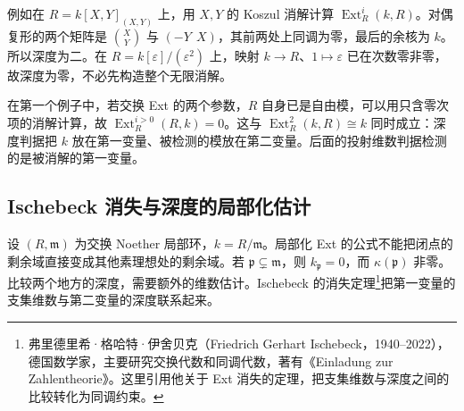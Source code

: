例如在 \(R=k[X,Y]_{(X,Y)}\) 上，用 \(X,Y\) 的 Koszul 消解计算 \(\operatorname{Ext}_R^i(k,R)\)。对偶复形的两个矩阵是 \(\binom XY\) 与 \((-Y\ \ X)\)，其前两处上同调为零，最后的余核为 \(k\)。所以深度为二。在 \(R=k[\varepsilon]/(\varepsilon^2)\) 上，映射 \(k\rightarrow R\)、\(1\mapsto\varepsilon\) 已在次数零非零，故深度为零，不必先构造整个无限消解。

\ProseParagraphBreak
在第一个例子中，若交换 Ext 的两个参数，\(R\) 自身已是自由模，可以用只含零次项的消解计算，故 \(\operatorname{Ext}_R^{i>0}(R,k)=0\)。这与 \(\operatorname{Ext}_R^2(k,R)\cong k\) 同时成立：深度判据把 \(k\) 放在第一变量、被检测的模放在第二变量。后面的投射维数判据检测的是被消解的第一变量。

\subsection{Ischebeck 消失与深度的局部化估计}
\label{b3:subsec:1602:03}

设 \((R,\mathfrak m)\) 为交换 Noether 局部环，\(k=R/\mathfrak m\)。局部化 Ext 的公式不能把闭点的剩余域直接变成其他素理想处的剩余域。若 \(\mathfrak p\subsetneq\mathfrak m\)，则 \(k_{\mathfrak p}=0\)，而 \(\kappa(\mathfrak p)\) 非零。比较两个地方的深度，需要额外的维数估计。Ischebeck 的消失定理\footnote{弗里德里希·格哈特·伊舍贝克（Friedrich Gerhart Ischebeck，1940--2022），德国数学家，主要研究交换代数和同调代数，著有《Einladung zur Zahlentheorie》。这里引用他关于 Ext 消失的定理，把支集维数与深度之间的比较转化为同调约束。}把第一变量的支集维数与第二变量的深度联系起来。

